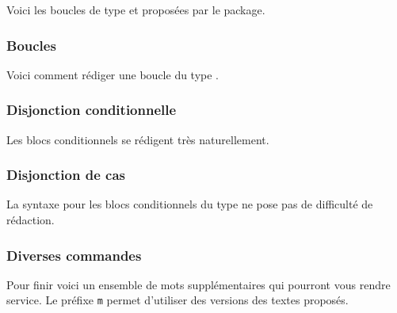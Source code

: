 \documentclass[12pt,a4paper]{article}
\begin{document}
Voici les boucles de type \TTfor{} et \TTwhile{} proposées par le package.

\newpage



\subsubsection{Boucles \TTrepeat{}}

Voici comment rédiger une boucle du type \TTrepeat{}.



\subsubsection{Disjonction conditionnelle \TTif{}}

Les blocs conditionnels \TTif{} se rédigent très naturellement.



\subsubsection{Disjonction de cas \TTswitch{}}

La syntaxe pour les blocs conditionnels du type \TTswitch{} ne pose pas de difficulté de rédaction.



\subsubsection{Diverses commandes}

Pour finir voici un ensemble de mots supplémentaires qui pourront vous rendre service. Le préfixe \verb+m+ permet d'utiliser des versions  des textes proposés.

\newpage



\end{document}
